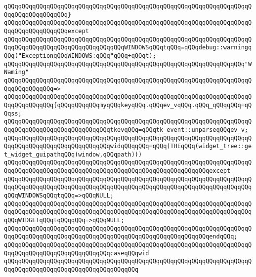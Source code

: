 \verb|qQQqqQQqqQQqqQQqqQQqqQQqqQQqqQQqqQQqqQQqqQQqqQQqqQQqqQQqqQQqqQQqqQQqqQQqqQQqqQQqqQQqqQQq}|\newline
\verb|qQQqqQQqqQQqqQQqqQQqqQQqqQQqqQQqqQQqqQQqqQQqqQQqqQQqqQQqqQQqqQQqqQQqqQQqqQQqqQQqqQQqqQQqexcept|\newline
\verb|qQQqqQQqqQQqqQQqqQQqqQQqqQQqqQQqqQQqqQQqqQQqqQQqqQQqqQQqqQQqqQQqqQQqqQQqqQQqqQQqqQQqqQQqqQQqqQQqqQQqqQQqWINDOWSqQQqtqQQq=qQQqdebug::warningqQQq("ExceptionqQQqWINDOWS:qQQq"qQQq+qQQqt);|\newline
\newline
\verb|qQQqqQQqqQQqqQQqqQQqqQQqqQQqqQQqqQQqqQQqqQQqqQQqqQQqqQQqqQQqqQQqqQQq"WNaming"|\newline
\verb|qQQqqQQqqQQqqQQqqQQqqQQqqQQqqQQqqQQqqQQqqQQqqQQqqQQqqQQqqQQqqQQqqQQqqQQqqQQqqQQqqQQq=>|\newline
\verb|qQQqqQQqqQQqqQQqqQQqqQQqqQQqqQQqqQQqqQQqqQQqqQQqqQQqqQQqqQQqqQQqqQQqqQQqqQQqqQQqqQQq{qQQqqQQqqQQqmyqQQqkeyqQQq.qQQqev_vqQQq.qQQq_qQQqqQQq=qQQqss;|\newline
\verb|qQQqqQQqqQQqqQQqqQQqqQQqqQQqqQQqqQQqqQQqqQQqqQQqqQQqqQQqqQQqqQQqqQQqqQQqqQQqqQQqqQQqqQQqqQQqqQQqqQQqtkevqQQq=qQQqtk_event::unparseqQQqev_v;|\newline
\newline
\verb|qQQqqQQqqQQqqQQqqQQqqQQqqQQqqQQqqQQqqQQqqQQqqQQqqQQqqQQqqQQqqQQqqQQqqQQqqQQqqQQqqQQqqQQqqQQqqQQqqQQqwidqQQqqQQq=qQQq(THEqQQq(widget_tree::get_widget_guipathqQQq(window,qQQqpath)))|\newline
\verb|qQQqqQQqqQQqqQQqqQQqqQQqqQQqqQQqqQQqqQQqqQQqqQQqqQQqqQQqqQQqqQQqqQQqqQQqqQQqqQQqqQQqqQQqqQQqqQQqqQQqqQQqqQQqqQQqqQQqqQQqqQQqqQQqexcept|\newline
\verb|qQQqqQQqqQQqqQQqqQQqqQQqqQQqqQQqqQQqqQQqqQQqqQQqqQQqqQQqqQQqqQQqqQQqqQQqqQQqqQQqqQQqqQQqqQQqqQQqqQQqqQQqqQQqqQQqqQQqqQQqqQQqqQQqqQQqqQQqqQQqqQQqWINDOWSqQQqtqQQq=>qQQqNULL;|\newline
\verb|qQQqqQQqqQQqqQQqqQQqqQQqqQQqqQQqqQQqqQQqqQQqqQQqqQQqqQQqqQQqqQQqqQQqqQQqqQQqqQQqqQQqqQQqqQQqqQQqqQQqqQQqqQQqqQQqqQQqqQQqqQQqqQQqqQQqqQQqqQQqqQQqWIDGETqQQqtqQQqqQQq=>qQQqNULL;|\newline
\verb|qQQqqQQqqQQqqQQqqQQqqQQqqQQqqQQqqQQqqQQqqQQqqQQqqQQqqQQqqQQqqQQqqQQqqQQqqQQqqQQqqQQqqQQqqQQqqQQqqQQqqQQqqQQqqQQqqQQqqQQqqQQqqQQqendqQQq;|\newline
\newline
\verb|qQQqqQQqqQQqqQQqqQQqqQQqqQQqqQQqqQQqqQQqqQQqqQQqqQQqqQQqqQQqqQQqqQQqqQQqqQQqqQQqqQQqqQQqqQQqqQQqqQQqcaseqQQqwid|\newline
\verb|qQQqqQQqqQQqqQQqqQQqqQQqqQQqqQQqqQQqqQQqqQQqqQQqqQQqqQQqqQQqqQQqqQQqqQQqqQQqqQQqqQQqqQQqqQQqqQQqqQQqqQQqqQQq|\newline
